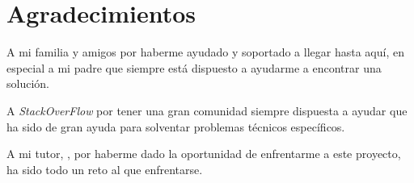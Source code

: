 \section{Agradecimientos}
A mi familia y amigos por haberme ayudado y soportado
a llegar hasta aquí, en especial a mi padre que siempre
está dispuesto a ayudarme a encontrar una solución.

\medskip
A \textit{StackOverFlow} por tener una gran comunidad
siempre dispuesta a ayudar que ha sido de gran ayuda
para solventar problemas técnicos específicos.

\medskip
A mi tutor, \tutor, por haberme dado la oportunidad de
enfrentarme a este proyecto, ha sido todo un reto al
que enfrentarse.